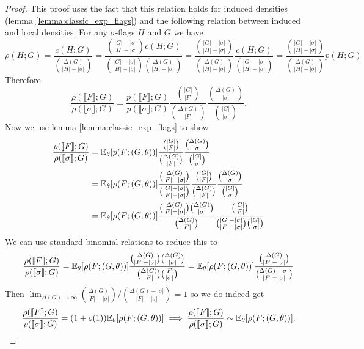 \begin{proof}
    This proof uses the fact that this relation holds for induced densities
    (lemma \ref{lemma:classic_exp_flags}) and the following relation between
    induced and local densities:
    For any $\sigma$-flags $H$ and $G$ we have
    \[
        \rho(H; G)
        = \frac{c(H; G)}{\binom{\Delta(G)}{|H|-|\sigma|}}
        = \frac{\binom{|G|-|\sigma|}{|H|-|\sigma|}c(H;
        G)}{\binom{|G|-|\sigma|}{|H|-|\sigma|}\binom{\Delta(G)}{|H|-|\sigma|}}
        =
        \frac{\binom{|G|-|\sigma|}{|H|-|\sigma|}}{\binom{\Delta(G)}{|H|-|\sigma|}}\frac{c(H;G)}{\binom{|G|-|\sigma|}{|H|-|\sigma|}}
        = \frac{\binom{|G|-|\sigma|}{|H|-|\sigma|}}{\binom{\Delta(G)}{|H|-|\sigma|}}p(H;G)
    \]
    Therefore
    \[
        \frac{\rho(\llbracket F\rrbracket; G)}
        {\rho(\llbracket \sigma\rrbracket; G)}
        =
        \frac{p(\llbracket F\rrbracket; G)}
        {p(\llbracket \sigma\rrbracket; G)}
        \frac{\binom{|G|}{|F|}}{\binom{\Delta(G)}{|F|}}
        \frac{\binom{\Delta(G)}{|\sigma|}}{\binom{|G|}{|\sigma|}}.
    \]
    Now we use lemma \ref{lemma:classic_exp_flags} to show
    \[
        \begin{split}
            \frac{\rho(\llbracket F\rrbracket; G)}
            {\rho(\llbracket \sigma\rrbracket; G)}
            &= \mathbb{E}_\theta[p(F; (G,\theta))]
            \frac{\binom{|G|}{|F|}}{\binom{\Delta(G)}{|F|}}
            \frac{\binom{\Delta(G)}{|\sigma|}}{\binom{|G|}{|\sigma|}}\\
            &= \mathbb{E}_\theta[\rho(F; (G,\theta))]
            \frac{\binom{\Delta(G)}{|F|-|\sigma|}}{\binom{|G|-|\sigma|}{|F|-|\sigma|}}
            \frac{\binom{|G|}{|F|}}{\binom{\Delta(G)}{|F|}}
            \frac{\binom{\Delta(G)}{|\sigma|}}{\binom{|G|}{|\sigma|}}\\
            &= \mathbb{E}_\theta[\rho(F; (G,\theta))]
            \frac{\binom{\Delta(G)}{|F|-|\sigma|}\binom{\Delta(G)}{|\sigma|}}
            {\binom{\Delta(G)}{|F|}}
            \frac{\binom{|G|}{|F|}}
            {\binom{|G|-|\sigma|}{|F|-|\sigma|}\binom{|G|}{|\sigma|}}
        \end{split}
    \]
    We can use standard binomial relations to reduce this to
    \[
        \frac{\rho(\llbracket F\rrbracket; G)}
        {\rho(\llbracket \sigma\rrbracket; G)}
        = \mathbb{E}_\theta[\rho(F; (G,\theta))]
        \frac{\binom{\Delta(G)}{|F|-|\sigma|}\binom{\Delta(G)}{|\sigma|}}
        {\binom{\Delta(G)}{|F|}\binom{|F|}{|\sigma|}}
        = \mathbb{E}_\theta[\rho(F; (G,\theta))]
        \frac{\binom{\Delta(G)}{|F|-|\sigma|}}
        {\binom{\Delta(G)-|\sigma|}{|F|-|\sigma|}}
    \]
    Then
    $\lim_{\Delta(G)\to\infty}\binom{\Delta(G)}{|F|-|\sigma|}/\binom{\Delta(G)-|\sigma|}{|F|-|\sigma|}
    = 1$ so we do indeed get
    \[
        \frac{\rho(\llbracket F\rrbracket; G)}
        {\rho(\llbracket \sigma\rrbracket; G)}
        = (1+o(1)) \mathbb{E}_\theta[\rho(F; (G,\theta))]
        \implies
        \frac{\rho(\llbracket F\rrbracket; G)}
        {\rho(\llbracket \sigma\rrbracket; G)}
        \sim \mathbb{E}_\theta[\rho(F; (G,\theta))].
    \]
\end{proof}

